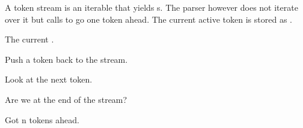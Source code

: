 \documentclass[a4paper,10pt,english]{sphinxmanual}
\begin{document}
\begin{fulllineitems}
\label{extensions:jinja2.lexer.TokenStream}
A token stream is an iterable that yields s.  The
parser however does not iterate over it but calls  to go
one token ahead.  The current active token is stored as {\hyperref[extensions:jinja2.ext.TokenStream.current]{}}.

\begin{fulllineitems}
\label{extensions:jinja2.ext.TokenStream.current}
The current {\hyperref[extensions:jinja2.lexer.Token]{}}.

\end{fulllineitems}


\begin{fulllineitems}
\label{extensions:jinja2.lexer.TokenStream.push}
Push a token back to the stream.

\end{fulllineitems}


\begin{fulllineitems}
\label{extensions:jinja2.lexer.TokenStream.look}
Look at the next token.

\end{fulllineitems}


\begin{fulllineitems}
\label{extensions:jinja2.lexer.TokenStream.eos}
Are we at the end of the stream?

\end{fulllineitems}


\begin{fulllineitems}
\label{extensions:jinja2.lexer.TokenStream.skip}
Got n tokens ahead.

\end{fulllineitems}


\end{fulllineitems}
\end{document}
